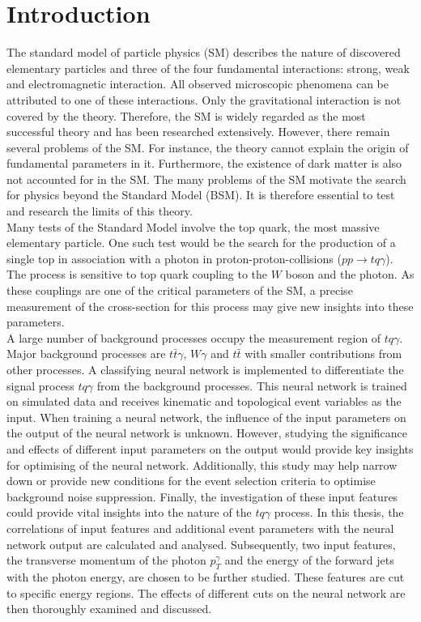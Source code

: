 \chapter{Introduction}


The standard model of particle physics (SM) describes the nature of discovered elementary particles and three of the four fundamental interactions: strong, weak and electromagnetic interaction. 
All observed microscopic phenomena can be attributed to one of these interactions. Only the gravitational interaction is not covered by the theory.  Therefore, the SM is widely regarded as the most successful theory and has been researched extensively. 
However, there remain several problems of the SM. For instance, the theory cannot explain the origin of fundamental parameters in it. Furthermore, the existence of dark matter is also not accounted for in the SM. The many problems of the SM motivate the search for physics beyond the Standard Model (BSM). 
It is therefore essential to test and research the limits of this theory.\\
 Many tests of the Standard Model involve the top quark, the most massive elementary particle. One such test would be the search for the production of a single top in association with a photon in proton-proton-collisions ($pp \rightarrow tq\gamma$). 
The process is sensitive to top quark coupling to the $W$ boson and the photon. As these couplings are one of the critical parameters of the SM, a precise measurement of the cross-section for this process may give new insights into these parameters. \\
 A large number of background processes occupy the measurement region of $tq\gamma$. Major background processes are $t\bar{t}\gamma$, $W\gamma$ and $t\bar{t}$ with smaller contributions from other processes. A classifying neural network is implemented to differentiate 
the signal process $tq\gamma$ from the background processes. This neural network is trained on simulated data and receives kinematic and topological event variables as the input. 
When training a neural network, the influence of the input parameters on the output of the neural network is unknown. However, studying the significance and effects of different input parameters on the output would provide key insights for optimising of the neural network. 
Additionally, this study may help narrow down or provide new conditions for the event selection criteria to optimise background noise suppression. Finally, the investigation of these input features could provide vital insights into the nature of the $tq\gamma$ process. 
In this thesis, the correlations of input features and additional event parameters with the neural network output are calculated and analysed. Subsequently, two input features, the transverse momentum of the photon $p_T^\gamma$ and the energy of the forward jets with the photon energy, are chosen to be further studied. 
These features are cut to specific energy regions. The effects of different cuts on the neural network are then thoroughly examined and discussed. 

